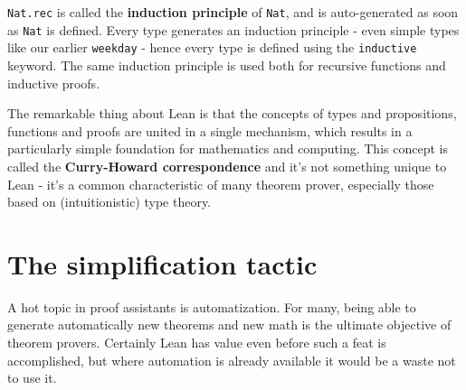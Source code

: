 \documentclass[oneside]{book}
\theoremstyle{definition}
\theoremstyle{remark}
\theoremstyle{plain}
\begin{document}
\lstinline{Nat.rec} is called the \textbf{induction principle} of \lstinline{Nat},
and is auto-generated as soon as \lstinline{Nat} is defined.
Every type generates an induction principle - even simple types like our earlier \lstinline{weekday} -
hence every type is defined using the \lstinline{inductive} keyword.
The same induction principle is used both for recursive functions and inductive proofs.

The remarkable thing about Lean is that the concepts of types and propositions, functions and proofs are united in a single mechanism,
which results in a particularly simple foundation for mathematics and computing.
This concept is called the \textbf{Curry-Howard correspondence} and it's not something unique to Lean -
it's a common characteristic of many theorem prover, especially those based on (intuitionistic) type theory.

\section{The simplification tactic}

A hot topic in proof assistants is automatization.
For many, being able to generate automatically new theorems and new math is the ultimate objective of theorem provers.
Certainly Lean has value even before such a feat is accomplished,
but where automation is already available it would be a waste not to use it.
\end{document}
